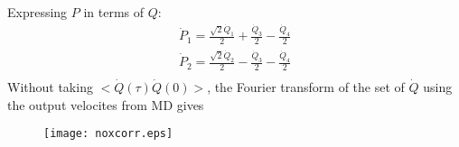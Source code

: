 Expressing $P$ in terms of $Q$:
\begin{align*}
\dot{P}_1=\frac{\sqrt{2}\dot{Q}_1}{2}+\frac{\dot{Q}_3}{2}-\frac{\dot{Q}_4}{2}\\
\dot{P}_2=\frac{\sqrt{2}\dot{Q}_2}{2}-\frac{\dot{Q}_3}{2}-\frac{\dot{Q}_4}{2}\\
\end{align*}
Without taking $<\dot{Q}(\tau)\dot{Q}(0)>$, the Fourier transform of the set of $\dot{Q}$ using the output velocites from MD gives
\begin{figure}[!h]
\centering
\texttt{[image: noxcorr.eps]}
\label{fig:awesome_image}
\end{figure}

